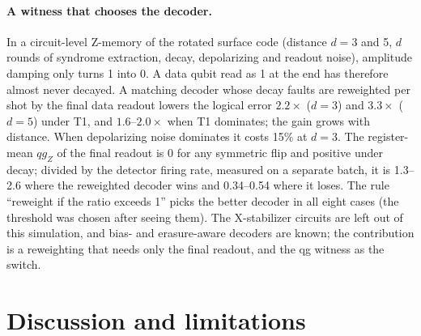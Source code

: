 \documentclass[11pt]{article}
\newcommand{\qgZ}{qg_Z}
\begin{document}
\paragraph{A witness that chooses the decoder.} In a circuit-level Z-memory of the rotated surface code
(distance $d=3$ and 5, $d$ rounds of syndrome extraction, decay, depolarizing and readout noise),
amplitude damping only turns 1 into 0. A data qubit read as 1 at the end has therefore almost never
decayed. A matching decoder whose decay faults are reweighted per shot by the final data readout lowers
the logical error $2.2\times$ ($d=3$) and $3.3\times$ ($d=5$) under T1, and $1.6$--$2.0\times$ when T1
dominates; the gain grows with distance. When depolarizing noise dominates it costs 15\% at $d=3$. The
register-mean $\qgZ$ of the final readout is 0 for any symmetric flip and positive under decay;
divided by the detector firing rate, measured on a separate batch, it is 1.3--2.6 where the reweighted
decoder wins and 0.34--0.54 where it loses. The rule ``reweight if the ratio exceeds 1'' picks the
better decoder in all eight cases (the threshold was chosen after seeing them). The X-stabilizer
circuits are left out of this simulation, and bias- and erasure-aware decoders are known; the
contribution is a reweighting that needs only the final readout, and the qg witness as the switch.

\section{Discussion and limitations}\label{sec:limits}
\end{document}
